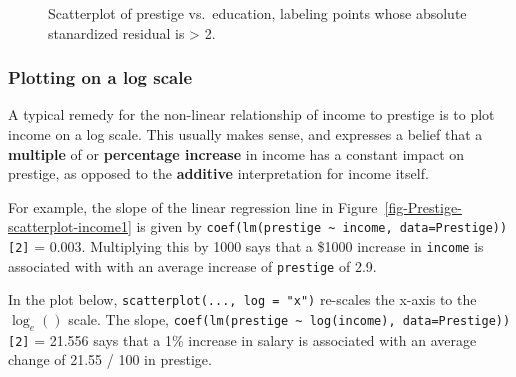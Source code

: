 \documentclass[
  letterpaper,
  10pt,
  krantz2]{krantz}
\begin{document}
{\begin{figure}


\caption{\label{fig-Prestige-scatterplot-educ2}Scatterplot of prestige
vs.~education, labeling points whose absolute stanardized residual is
\textgreater{} 2.}

\end{figure}%

\subsubsection{Plotting on a log scale}\label{sec-log-scale}

A typical remedy for the non-linear relationship of income to prestige
is to plot income on a log scale. This usually makes sense, and
expresses a belief that a \textbf{multiple} of or \textbf{percentage
increase} in income has a constant impact on prestige, as opposed to the
\textbf{additive} interpretation for income itself.

For example, the slope of the linear regression line in
Figure~\ref{fig-Prestige-scatterplot-income1} is given by
\texttt{coef(lm(prestige\ \textasciitilde{}\ income,\ data=Prestige)){[}2{]}}
= 0.003. Multiplying this by 1000 says that a \$1000 increase in
\texttt{income} is associated with with an average increase of
\texttt{prestige} of 2.9.

In the plot below, \texttt{scatterplot(...,\ log\ =\ "x")} re-scales the
x-axis to the \(\log_e()\) scale. The slope,
\texttt{coef(lm(prestige\ \textasciitilde{}\ log(income),\ data=Prestige)){[}2{]}}
= 21.556 says that a 1\% increase in salary is associated with an
average change of 21.55 / 100 in prestige.

}
\end{document}
